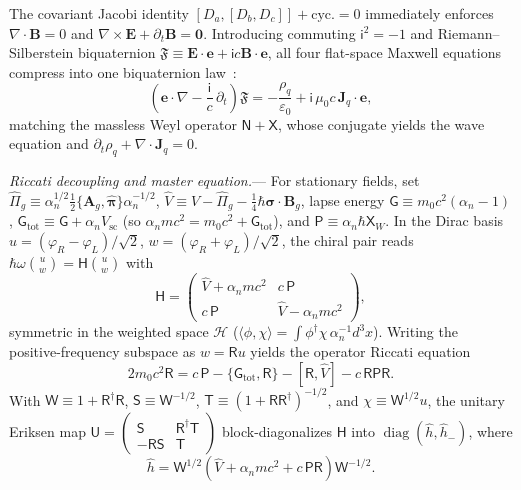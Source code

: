 \documentclass[aps,prl,reprint,superscriptaddress,nofootinbib,floatfix]{revtex4-2}
\theoremstyle{prlthm}
\newcommand{\prlsec}[1]{\par\smallskip\noindent\emph{#1.}---}
\begin{document}
The covariant Jacobi identity $[D_a,[D_b,D_c]]+\text{cyc.}=0$ immediately enforces $\nabla\cdot\mathbf{B}=0$ and $\nabla\times\mathbf{E}+\partial_t\mathbf{B}=\mathbf{0}$. Introducing commuting $\mathsf{i}^2=-1$ and Riemann--Silberstein biquaternion $\mathfrak{F}\equiv\mathbf{E}\cdot\mathbf{e}+\mathsf{i}c\mathbf{B}\cdot\mathbf{e}$, all four flat-space Maxwell equations compress into one biquaternion law~\citep{Silberstein1912Quaternionic,BialynickiBirula1996Photon}:
\begin{equation}
  \left(\mathbf{e}\cdot\nabla-\frac{\mathsf{i}}{c}\,\partial_t\right)\mathfrak{F}=-\frac{\rho_q}{\varepsilon_0}+\mathsf{i}\,\mu_0 c\,\mathbf{J}_q\cdot\mathbf{e},
  \label{eq:maxwell_biquaternion}
\end{equation}
matching the massless Weyl operator $\mathsf{N}+\mathsf{X}$, whose conjugate yields the wave equation and $\partial_t\rho_q+\nabla\cdot\mathbf{J}_q=0$.

\prlsec{Riccati decoupling and master equation}
For stationary fields, set $\hat{\Pi}_g\equiv\alpha_n^{1/2}\tfrac{1}{2}\{\mathbf{A}_g,\hat{\boldsymbol{\pi}}\}\alpha_n^{-1/2}$, $\hat{V}\equiv V-\hat{\Pi}_g-\tfrac{1}{4}\hbar\boldsymbol{\sigma}\cdot\mathbf{B}_g$, lapse energy $\mathsf{G}\equiv m_0c^2(\alpha_n-1)$, $\mathsf{G}_\text{tot}\equiv\mathsf{G}+\alpha_n V_\text{sc}$ (so $\alpha_nmc^2=m_0c^2+\mathsf{G}_\text{tot}$), and $\mathsf{P}\equiv\alpha_n\hbar\mathsf{X}_W$. In the Dirac basis $u=(\varphi_R-\varphi_L)/\sqrt{2}$, $w=(\varphi_R+\varphi_L)/\sqrt{2}$, the chiral pair reads $\hbar\omega\binom{u}{w}=\mathsf{H}\binom{u}{w}$ with
\begin{equation}
  \mathsf{H}=\begin{pmatrix}\hat{V}+\alpha_n mc^2 & c\,\mathsf{P}\\ c\,\mathsf{P} & \hat{V}-\alpha_n mc^2\end{pmatrix},
  \label{eq:block_equation}
\end{equation}
symmetric in the weighted space $\mathcal{H}$ ($\langle\phi,\chi\rangle=\int\phi^\dagger\chi\,\alpha_n^{-1}d^3x$). Writing the positive-frequency subspace as $w=\mathsf{R}u$ yields the operator Riccati equation
\begin{equation}
  2m_0c^2\mathsf{R}=c\,\mathsf{P}-\{\mathsf{G}_\text{tot},\mathsf{R}\}-[\mathsf{R},\hat{V}]-c\,\mathsf{R}\mathsf{P}\mathsf{R}.
  \label{eq:riccati}
\end{equation}
With $\mathsf{W}\equiv 1+\mathsf{R}^\dagger\mathsf{R}$, $\mathsf{S}\equiv\mathsf{W}^{-1/2}$, $\mathsf{T}\equiv(1+\mathsf{R}\mathsf{R}^\dagger)^{-1/2}$, and $\chi\equiv\mathsf{W}^{1/2}u$, the unitary Eriksen map $\mathsf{U}=(\begin{smallmatrix}\mathsf{S}&\mathsf{R}^\dagger\mathsf{T}\\-\mathsf{R}\mathsf{S}&\mathsf{T}\end{smallmatrix})$ block-diagonalizes $\mathsf{H}$ into $\operatorname{diag}(\hat{h},\hat{h}_-)$, where
\begin{equation}
  \hat{h}=\mathsf{W}^{1/2}(\hat{V}+\alpha_n mc^2+c\,\mathsf{P}\mathsf{R})\mathsf{W}^{-1/2}.
  \label{eq:frequency_hamiltonian}
\end{equation}
\end{document}
